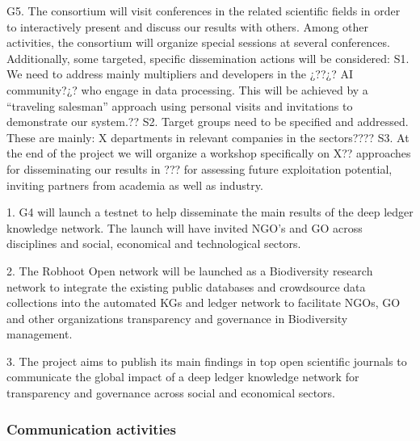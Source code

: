 \documentclass[11pt, a4paper]{article} %
\begin{document}
G5. The consortium will visit conferences in the related scientific
fields in order to interactively present and discuss our results with
others. Among other activities, the consortium will organize special
sessions at several conferences.  Additionally, some targeted,
specific dissemination actions will be considered: S1. We need to
address mainly multipliers and developers in the ¿??¿? AI community?¿?
who engage in data processing. This will be achieved by a “traveling
salesman” approach using personal visits and invitations to
demonstrate our system.??  S2. Target groups need to be specified and
addressed.  These are mainly: X departments in relevant companies in
the sectors????  S3. At the end of the project we will organize a
workshop specifically on X?? approaches for disseminating our results
in ??? for assessing future exploitation potential, inviting partners
from academia as well as industry.

1. G4 will launch a testnet to help disseminate the main results of
the deep ledger knowledge network. The launch will have invited NGO’s
and GO across disciplines and social, economical and technological
sectors.

2. The Robhoot Open network will be launched as a Biodiversity
research network to integrate the existing public databases and
crowdsource data collections into the automated KGs and ledger network
to facilitate NGOs, GO and other organizations transparency and
governance in Biodiversity management.

3. The project aims to publish its main findings in top open
scientific journals to communicate the global impact of a deep ledger
knowledge network for transparency and governance across social and
economical sectors.


\subsubsection{Communication activities}
\label{sec:communication}
\end{document}
